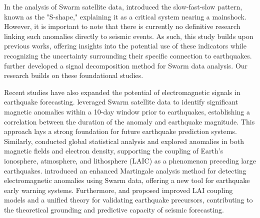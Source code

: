 \documentclass[3p,authoryear,preprint,12pt]{elsarticle}
\begin{document}
In the analysis of Swarm satellite data, \cite{desantisPotentialEarthquakePrecursory2017} introduced the slow-fast-slow pattern, known as the "S-shape," explaining it as a critical system nearing a mainshock. 
{However, it is important to note that there is currently no definitive research linking such anomalies directly to seismic events. As such, this study builds upon previous works, offering insights into the potential use of these indicators while recognizing the uncertainty surrounding their specific connection to earthquakes.}
 \cite{fanAnalysisSwarmSatellite2022a} further developed a signal decomposition method for Swarm data analysis. Our research builds on these foundational studies.

Recent studies have also expanded the potential of electromagnetic signals in earthquake forecasting. \cite{alimoradiSuccessfulTestsDetecting2024} leveraged Swarm satellite data to identify significant magnetic anomalies within a 10-day window prior to earthquakes, establishing a correlation between the duration of the anomaly and earthquake magnitude. This approach lays a strong foundation for future earthquake prediction systems. Similarly, \cite{desantisPrecursoryWorldwideSignatures2019} conducted global statistical analysis and explored anomalies in both magnetic fields and electron density, supporting the coupling of Earth’s ionosphere, atmosphere, and lithosphere (LAIC) as a phenomenon preceding large earthquakes. \cite{harriganDetectionElectromagneticSeismic2024} introduced an enhanced Martingale analysis method for detecting electromagnetic anomalies using Swarm data, offering a new tool for earthquake early warning systems. Furthermore, \cite{kuoImprovedCouplingModel} and \cite{pulinetsLithosphereAtmosphereIonosphere2011} proposed improved LAI coupling models and a unified theory for validating earthquake precursors, contributing to the theoretical grounding and predictive capacity of seismic forecasting.
\end{document}
